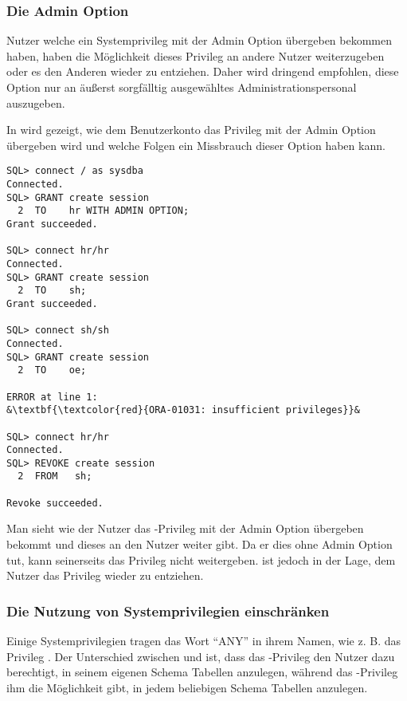         \subsubsection{Die Admin Option}
          \begin{merke}
            Nutzer welche ein Systemprivileg mit der Admin Option \"ubergeben
            bekommen haben, haben die M\"oglichkeit dieses Privileg an andere
            Nutzer weiterzugeben oder es den Anderen wieder zu entziehen. Daher
            wird dringend empfohlen, diese Option nur an äußerst sorgfälltig
            ausgewähltes Administrationspersonal auszugeben.
          \end{merke}
          In  wird gezeigt, wie dem Benutzerkonto
           das  Privileg mit der Admin
          Option übergeben wird und welche Folgen ein Missbrauch dieser Option
          haben kann.
          \begin{lstlisting}[caption={Zuweisen eines System Privileges mit ADMIN
          OPTION},label=admin230,language=oracle_sql,alsolanguage=sqlplus]
SQL> connect / as sysdba
Connected.
SQL> GRANT create session
  2  TO    hr WITH ADMIN OPTION;
Grant succeeded.

SQL> connect hr/hr
Connected.
SQL> GRANT create session
  2  TO    sh;
Grant succeeded.

SQL> connect sh/sh
Connected.
SQL> GRANT create session
  2  TO    oe;

ERROR at line 1:
&\textbf{\textcolor{red}{ORA-01031: insufficient privileges}}&

SQL> connect hr/hr
Connected.
SQL> REVOKE create session
  2  FROM   sh;

Revoke succeeded.
          \end{lstlisting}
          Man sieht wie der Nutzer  das -Privileg mit der Admin Option \"ubergeben bekommt und dieses
          an den Nutzer  weiter gibt. Da er dies ohne Admin
          Option tut, kann  seinerseits das Privileg nicht
          weitergeben.  ist jedoch in der Lage, dem Nutzer
           das Privileg wieder zu entziehen.
        \subsubsection{Die Nutzung von Systemprivilegien einschr\"anken}
          Einige Systemprivilegien tragen das Wort \enquote{ANY} in ihrem Namen,
          wie z. B. das Privileg . Der Unterschied
          zwischen  und  ist,
          dass das -Privileg den Nutzer dazu berechtigt,
          in seinem eigenen Schema Tabellen anzulegen, w\"ahrend das
          -Privileg ihm die M\"oglichkeit gibt, in
          jedem beliebigen Schema Tabellen anzulegen.

